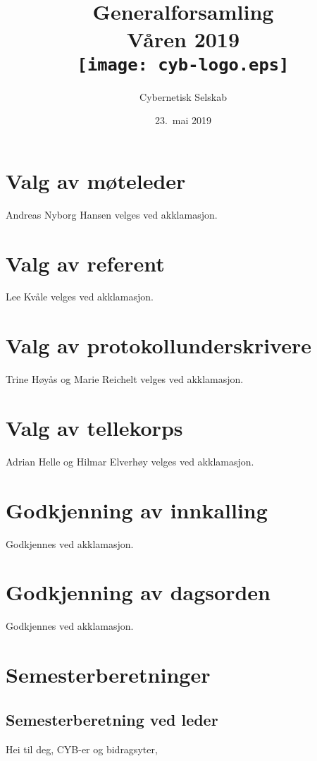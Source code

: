 \documentclass[10pt,norsk,a4paper]{article}
\title{Generalforsamling \\
	Våren 2019\\[3cm]
	\texttt{[image: cyb-logo.eps]}\\[-.5cm]}
\date{23.\ mai 2019}
\author{Cybernetisk Selskab}
\begin{document}
\maketitle{}
\newpage
\tableofcontents

\section{Valg av møteleder}
Andreas Nyborg Hansen velges ved akklamasjon.

\section{Valg av referent}
Lee Kvåle velges ved akklamasjon.

\section{Valg av protokollunderskrivere}
Trine Høyås og Marie Reichelt velges ved akklamasjon.

\section{Valg av tellekorps}
Adrian Helle og Hilmar Elverhøy velges ved akklamasjon. 

\section{Godkjenning av innkalling}
Godkjennes ved akklamasjon.

\section{Godkjenning av dagsorden}
Godkjennes ved akklamasjon.

\newpage

\section{Semesterberetninger}
\subsection{Semesterberetning ved leder}

Hei til deg, CYB-er og bidragsyter,
\end{document}
